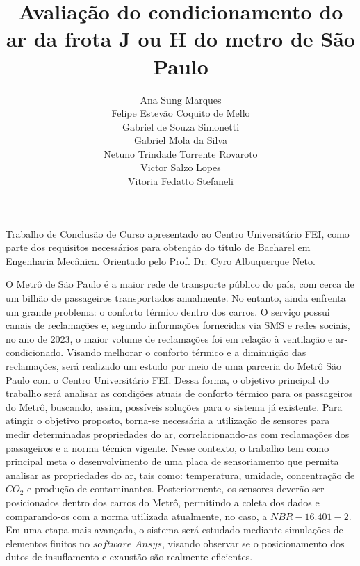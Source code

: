 \documentclass[acronym,symbols]{fei}
\title{Avaliação do condicionamento do ar da frota J ou H do metro de São Paulo}
\author{Ana Sung Marques \\Felipe Estevão Coquito de Mello\\  Gabriel de Souza Simonetti  \\ Gabriel Mola da Silva \\ Netuno Trindade Torrente Rovaroto \\ Victor Salzo Lopes  \\ Vitoria Fedatto Stefaneli}
\begin{document}
\maketitle

\begin{folhaderosto}
	Trabalho de Conclusão de Curso apresentado ao Centro Universitário FEI, como parte dos requisitos necessários para obtenção do título de Bacharel em Engenharia Mecânica. Orientado pelo Prof. Dr. Cyro Albuquerque Neto.
\end{folhaderosto}

\begin{agradecimentos}

\end{agradecimentos}

\begin{resumo}
O Metrô de São Paulo é a maior rede de transporte público do país, com cerca de um bilhão de passageiros transportados anualmente. No entanto, ainda enfrenta um grande problema: o conforto térmico dentro dos carros. O serviço possui canais de reclamações e, segundo informações fornecidas via SMS e redes sociais, no ano de 2023, o maior volume de reclamações foi em relação à ventilação e ar-condicionado. Visando melhorar o conforto térmico e a diminuição das reclamações, será realizado um estudo por meio de uma parceria do Metrô São Paulo com o Centro Universitário FEI. Dessa forma, o objetivo principal do trabalho será analisar as condições atuais de conforto térmico para os passageiros do Metrô, buscando, assim, possíveis soluções para o sistema já existente. Para atingir o objetivo proposto, torna-se necessária a utilização de sensores para medir determinadas propriedades do ar, correlacionando-as com reclamações dos passageiros e a norma técnica vigente. Nesse contexto, o trabalho tem como principal meta o desenvolvimento de uma placa de sensoriamento que permita analisar as propriedades do ar, tais como: temperatura, umidade, concentração de $CO_2$ e produção de contaminantes. Posteriormente, os sensores deverão ser posicionados dentro dos carros do Metrô, permitindo a coleta dos dados e comparando-os com a norma utilizada atualmente, no caso, a $NBR-16.401-2$. Em uma etapa mais avançada, o sistema será estudado mediante simulações de elementos finitos no $software$ $Ansys$, visando observar se o posicionamento dos dutos de insuflamento e exaustão são realmente eficientes. 


\end{resumo}
\end{document}
